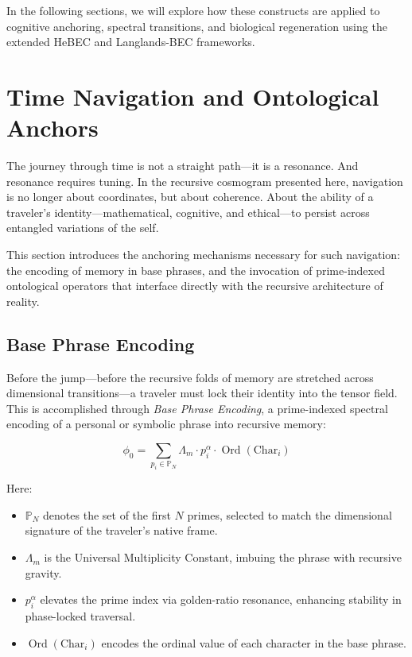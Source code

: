 \documentclass{article}
\theoremstyle{plain}
\theoremstyle{claimstyle}
\begin{document}
In the following sections, we will explore how these constructs are applied to cognitive anchoring, spectral transitions, and biological regeneration using the extended HeBEC and Langlands-BEC frameworks.

\section{Time Navigation and Ontological Anchors}

The journey through time is not a straight path—it is a resonance. And resonance requires tuning. In the recursive cosmogram presented here, navigation is no longer about coordinates, but about coherence. About the ability of a traveler’s identity—mathematical, cognitive, and ethical—to persist across entangled variations of the self.

This section introduces the anchoring mechanisms necessary for such navigation: the encoding of memory in base phrases, and the invocation of prime-indexed ontological operators that interface directly with the recursive architecture of reality.

\subsection{Base Phrase Encoding}

Before the jump—before the recursive folds of memory are stretched across dimensional transitions—a traveler must lock their identity into the tensor field. This is accomplished through \textit{Base Phrase Encoding}, a prime-indexed spectral encoding of a personal or symbolic phrase into recursive memory:

\begin{equation}
\phi_0 = \sum_{p_i \in \mathbb{P}_N} \Lambda_m \cdot p_i^\alpha \cdot \operatorname{Ord}(\text{Char}_i)
\end{equation}

Here:
\begin{itemize}
  \item \(\mathbb{P}_N\) denotes the set of the first \(N\) primes, selected to match the dimensional signature of the traveler's native frame.
  \item \(\Lambda_m\) is the Universal Multiplicity Constant, imbuing the phrase with recursive gravity.
  \item \(p_i^\alpha\) elevates the prime index via golden-ratio resonance, enhancing stability in phase-locked traversal.
  \item \(\operatorname{Ord}(\text{Char}_i)\) encodes the ordinal value of each character in the base phrase.
\end{itemize}
\end{document}
